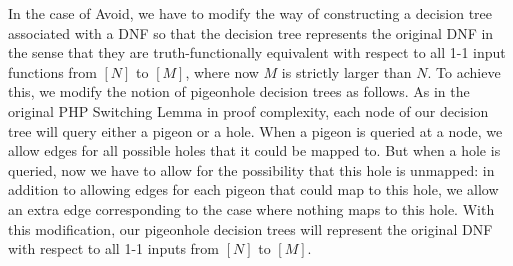 \documentclass[11pt]{article}
\begin{document}
In the case of Avoid, we have to modify the way of constructing a decision tree associated with a DNF so that the decision tree represents the original DNF in the sense that they are truth-functionally equivalent with respect to all 1-1 input functions from $[N]$ to $[M]$, where now $M$ is strictly larger than $N$. 
To achieve this, we modify the notion of pigeonhole decision trees as follows. As in the original PHP Switching Lemma in proof complexity, each node of our decision tree will query either a pigeon or a hole. When a pigeon is queried at a node, we allow edges for all possible holes that it could be mapped to. But when a hole is queried, now we have to allow for the possibility that this hole is unmapped: in addition to allowing edges for each pigeon that could map to this hole, we allow an extra edge corresponding to the case where nothing maps to this hole. With this modification, our pigeonhole decision trees will represent the original DNF with respect to all 1-1 inputs from $[N]$ to $[M]$. 
\end{document}
